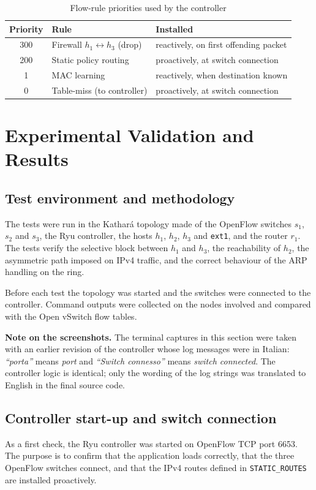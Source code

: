 \documentclass[11pt,a4paper]{article}
\newcommand{\code}[1]{\texttt{#1}}
\begin{document}
\begin{table}[H]
\centering
\begin{tabular}{clp{7cm}}
\toprule
Priority & Rule & Installed\\
\midrule
300 & Firewall $h_1\leftrightarrow h_3$ (drop) & reactively, on first offending packet\\
200 & Static policy routing & proactively, at switch connection\\
1 & MAC learning & reactively, when destination known\\
0 & Table-miss (to controller) & proactively, at switch connection\\
\bottomrule
\end{tabular}
\caption{Flow-rule priorities used by the controller}
\end{table}

\section{Experimental Validation and Results}
\subsection{Test environment and methodology}
The tests were run in the Kathar\'a topology made of the OpenFlow switches
$s_1$, $s_2$ and $s_3$, the Ryu controller, the hosts $h_1$, $h_2$, $h_3$ and
\code{ext1}, and the router $r_1$. The tests verify the selective block between
$h_1$ and $h_3$, the reachability of $h_2$, the asymmetric path imposed on IPv4
traffic, and the correct behaviour of the ARP handling on the ring.

Before each test the topology was started and the switches were connected to the
controller. Command outputs were collected on the nodes involved and compared
with the Open vSwitch flow tables.

\textbf{Note on the screenshots.} The terminal captures in this section were
taken with an earlier revision of the controller whose log messages were in
Italian: \emph{``porta''} means \emph{port} and \emph{``Switch connesso''} means
\emph{switch connected}. The controller logic is identical; only the wording of
the log strings was translated to English in the final source code.

\subsection{Controller start-up and switch connection}
As a first check, the Ryu controller was started on OpenFlow TCP port 6653. The
purpose is to confirm that the application loads correctly, that the three
OpenFlow switches connect, and that the IPv4 routes defined in
\code{STATIC\_ROUTES} are installed proactively.
\end{document}
